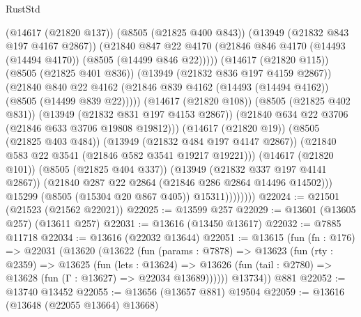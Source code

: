\begin{lexlean}{RustStd}
\begin{coremodule}
                              (@14617 (@21820 @137))
                              (@8505 (@21825 @400 @843))
                              (@13949 (@21832 @843 @197 @4167 @2867))
                              (@21840
                                @847
                                @22
                                @4170
                                (@21846
                                  @846
                                  @4170
                                  (@14493 (@14494 @4170))
                                  (@8505 (@14499 @846 @22)))))
                            (@14617 (@21820 @115))
                            (@8505 (@21825 @401 @836))
                            (@13949 (@21832 @836 @197 @4159 @2867))
                            (@21840
                              @840
                              @22
                              @4162
                              (@21846
                                @839
                                @4162
                                (@14493 (@14494 @4162))
                                (@8505 (@14499 @839 @22)))))
                          (@14617 (@21820 @108))
                          (@8505 (@21825 @402 @831))
                          (@13949 (@21832 @831 @197 @4153 @2867))
                          (@21840 @634 @22 @3706 (@21846 @633 @3706 @19808 @19812)))
                        (@14617 (@21820 @19))
                        (@8505 (@21825 @403 @484))
                        (@13949 (@21832 @484 @197 @4147 @2867))
                        (@21840 @583 @22 @3541 (@21846 @582 @3541 @19217 @19221)))
                      (@14617 (@21820 @101))
                      (@8505 (@21825 @404 @337))
                      (@13949 (@21832 @337 @197 @4141 @2867))
                      (@21840 @287 @22 @2864 (@21846 @286 @2864 @14496 @14502)))
                    @15299
                    (@8505 (@15304 @20 @867 @405))
                    @15311))))))))
@22024 := @21501 (@21523 (@21562 @22021))
@22025 := @13599 @257
@22029 := @13601 (@13605 @257) (@13611 @257)
@22031 := @13616 (@13450 @13617)
@22032 := @7885 @11718
@22034 := @13616 (@22032 @13644)
@22051 := @13615
    (fun (fn : @176) =>
    @22031
      (@13620
        (@13622
          (fun (params : @7878) =>
          @13623
            (fun (rty : @2359) =>
            @13625
              (fun (lets : @13624) =>
              @13626 (fun (tail : @2780) => @13628 (fun (Γ : @13627) => @22034 @13689))))))
        @13734))
    @881
@22052 := @13740 @13452
@22055 := @13656 (@13657 @881) @19504
@22059 := @13616 (@13648 (@22055 @13664) @13668)

\end{coremodule}
\end{lexlean}
